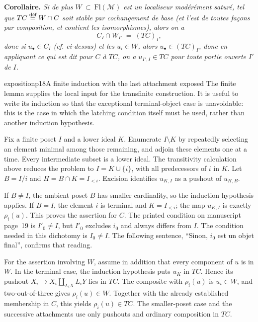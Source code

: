 \textbf{Corollaire.} \textit{Si de plus $W \ \subset\ \mathrm{Fl}(\mathcal{M})$ est un localiseur modérément saturé, tel que $TC \overset{\textup{déf}}{=} W \cap C$ soit stable par cochangement de base (et l'est de toutes façons par composition, et contient les isomorphismes), alors on a}
\[
C_I \cap W_{I^\circ} \ = \ (TC)_I,
\]
\textit{donc si $u_\bullet \in C_I$ (cf. ci-dessus) et les $u_i \in W$, alors $u_\bullet \in (TC)_I$, donc en appliquant ce qui est dit pour $C$ à $TC$, on a $u_{I',I} \in TC$ pour toute}  \textit{partie ouverte $I'$ de $I$.}

\begin{dcomment}{exposition}{p18}{A finite induction with the last attachment exposed}
The finite lemma supplies the local input for the transfinite construction. It is useful to write its induction so that the exceptional terminal-object case is unavoidable: this is the case in which the latching condition itself must be used, rather than another induction hypothesis.

Fix a finite poset $I$ and a lower ideal $K$. Enumerate $I\setminus K$ by repeatedly selecting an element minimal among those remaining, and adjoin these elements one at a time. Every intermediate subset is a lower ideal. The transitivity calculation above reduces the problem to $I=K\cup\{i\}$, with all predecessors of $i$ in $K$. Let $B=I/i$ and $H=B\cap K=I_{<i}$. Excision identifies $u_{K,I}$ as a pushout of $u_{H,B}$.

If $B\ne I$, the ambient poset $B$ has smaller cardinality, so the induction hypothesis applies. If $B=I$, the element $i$ is terminal and $K=I_{<i}$; the map $u_{K,I}$ is exactly $\rho_i(u)$. This proves the assertion for $C$. The printed condition on manuscript page~19 is $I'_0\ne I$, but $I'_0$ excludes $i_0$ and always differs from $I$. The condition needed in this dichotomy is $I_0\ne I$. The following sentence, ``Sinon, $i_0$ est un objet final'', confirms that reading.

For the assertion involving $W$, assume in addition that every component of $u$ is in $W$. In the terminal case, the induction hypothesis puts $u_K$ in $TC$. Hence its pushout $X_i\to X_i\amalg_{L_iX}L_iY$ lies in $TC$. The composite with $\rho_i(u)$ is $u_i\in W$, and two-out-of-three gives $\rho_i(u)\in W$. Together with the already established membership in $C$, this yields $\rho_i(u)\in TC$. The smaller-poset case and the successive attachments use only pushouts and ordinary composition in $TC$.


\end{dcomment}
